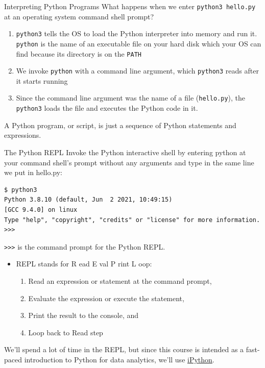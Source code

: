 \documentclass[smaller, aspectratio=1610]{beamer}
\begin{document}
\begin{frame}[label={sec:org28d9ba7},fragile]{Interpreting Python Programs}
 What happens when we enter \texttt{python3 hello.py} at an operating system command shell prompt?

\begin{enumerate}
\item \texttt{python3} tells the OS to load the Python interpreter into memory and run it. \texttt{python} is the name of an executable file on your hard disk which your OS can find because its directory is on the \texttt{PATH}
\item We invoke \texttt{python} with a \alert{command line argument}, which \texttt{python3} reads after it starts running
\item Since the command line argument was the name of a file (\texttt{hello.py}), the \texttt{python3} loads the file and executes the Python code in it.
\end{enumerate}

A Python program, or script, is just a sequence of Python statements and expressions.
\end{frame}

\begin{frame}[label={sec:org53c4649},fragile]{The Python REPL}
 Invoke the Python interactive shell by entering python at your command shell’s prompt without any arguments and type in the same line we put in hello.py:

\lstset{language=sh,label= ,caption= ,captionpos=b,numbers=none}
\begin{lstlisting}
$ python3
Python 3.8.10 (default, Jun  2 2021, 10:49:15)
[GCC 9.4.0] on linux
Type "help", "copyright", "credits" or "license" for more information.
>>>
\end{lstlisting}

\texttt{>>>} is the command prompt for the Python REPL.

\begin{itemize}
\item REPL stands for \alert{R} ead \alert{E} val \alert{P} rint \alert{L} oop:
\begin{enumerate}
\item \alert{Read} an expression or statement at the command prompt,
\item \alert{Evaluate} the expression or execute the statement,
\item \alert{Print} the result to the console, and
\item \alert{Loop} back to \alert{Read} step
\end{enumerate}
\end{itemize}

We’ll spend a lot of time in the REPL, but since this course is intended as a fast-paced introduction to Python for data analytics, we'll use \href{https://ipython.org/}{iPython}.
\end{frame}
\end{document}
